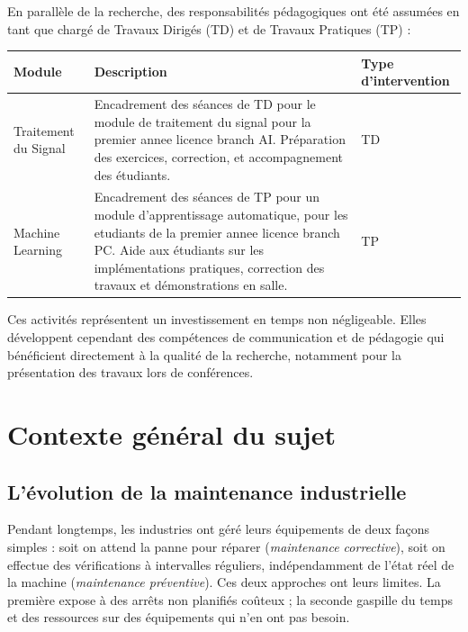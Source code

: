 \documentclass[12pt, a4paper]{report}
\begin{document}
En parallèle de la recherche, des responsabilités pédagogiques ont été assumées
en tant que chargé de Travaux Dirigés (TD) et de Travaux Pratiques (TP) :

\begin{table}[h!]
\centering
\renewcommand{\arraystretch}{1.4}
\begin{tabularx}{\textwidth}{lXl}
\toprule
Module & Description & Type d'intervention \\
\midrule
Traitement du Signal & Encadrement des séances de TD pour le module de
traitement du signal pour la premier annee licence branch AI. Préparation des exercices, correction, et
accompagnement des étudiants. & TD \\[4pt]
Machine Learning & Encadrement des séances de TP pour un module d'apprentissage
automatique, pour les etudiants de la premier annee licence branch PC. Aide aux étudiants sur les implémentations pratiques,
correction des travaux et démonstrations en salle. & TP \\
\bottomrule
\end{tabularx}
\end{table}

Ces activités représentent un investissement en temps non négligeable. Elles
développent cependant des compétences de communication et de pédagogie qui
bénéficient directement à la qualité de la recherche, notamment pour la présentation
des travaux lors de conférences.

\chapter{Contexte général du sujet}

\section{L'évolution de la maintenance industrielle}

Pendant longtemps, les industries ont géré leurs équipements de deux façons simples :
soit on attend la panne pour réparer (\textit{maintenance corrective}), soit on
effectue des vérifications à intervalles réguliers, indépendamment de l'état réel
de la machine (\textit{maintenance préventive}). Ces deux approches ont leurs limites.
La première expose à des arrêts non planifiés coûteux ; la seconde gaspille du temps
et des ressources sur des équipements qui n'en ont pas besoin.
\end{document}

